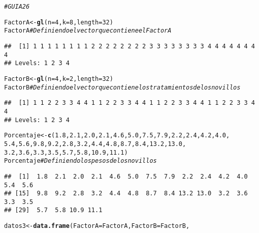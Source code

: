 \documentclass{article}\usepackage[]{graphicx}\usepackage[]{color}
\makeatletter
\newcommand{\hlnum}[1]{\textcolor[rgb]{0.686,0.059,0.569}{#1}}%
\newcommand{\hlcom}[1]{\textcolor[rgb]{0.678,0.584,0.686}{\textit{#1}}}%
\newcommand{\hlstd}[1]{\textcolor[rgb]{0.345,0.345,0.345}{#1}}%
\newcommand{\hlkwb}[1]{\textcolor[rgb]{0.69,0.353,0.396}{#1}}%
\newcommand{\hlkwc}[1]{\textcolor[rgb]{0.333,0.667,0.333}{#1}}%
\newcommand{\hlkwd}[1]{\textcolor[rgb]{0.737,0.353,0.396}{\textbf{#1}}}%
\newenvironment{kframe}{%
 \def\at@end@of@kframe{}%
 \ifinner\ifhmode%
  \def\at@end@of@kframe{\end{minipage}}%
  \begin{minipage}{\columnwidth}%
 \fi\fi%
 \def\FrameCommand##1{\hskip\@totalleftmargin \hskip-\fboxsep
 \colorbox{shadecolor}{##1}\hskip-\fboxsep
     \hskip-\linewidth \hskip-\@totalleftmargin \hskip\columnwidth}%
 \MakeFramed {\advance\hsize-\width
   \@totalleftmargin\z@ \linewidth\hsize
   \@setminipage}}%
 {\par\unskip\endMakeFramed%
 \at@end@of@kframe}
\newenvironment{knitrout}{}{} %
\makeatother
\begin{document}
\begin{knitrout}
\color{fgcolor}\begin{kframe}
\begin{alltt}
\hlcom{#GUIA 26}

\hlstd{FactorA}\hlkwb{<-}\hlkwd{gl}\hlstd{(}\hlkwc{n}\hlstd{=}\hlnum{4}\hlstd{,}\hlkwc{k}\hlstd{=}\hlnum{8}\hlstd{,}\hlkwc{length} \hlstd{=} \hlnum{32}\hlstd{)}
\hlstd{FactorA} \hlcom{# Definiendo el vector que contiene el Factor A}
\end{alltt}
\begin{verbatim}
##  [1] 1 1 1 1 1 1 1 1 2 2 2 2 2 2 2 2 3 3 3 3 3 3 3 3 4 4 4 4 4 4 4 4
## Levels: 1 2 3 4
\end{verbatim}
\begin{alltt}
\hlstd{FactorB}\hlkwb{<-}\hlkwd{gl}\hlstd{(}\hlkwc{n}\hlstd{=}\hlnum{4}\hlstd{,}\hlkwc{k}\hlstd{=}\hlnum{2}\hlstd{,}\hlkwc{length} \hlstd{=} \hlnum{32}\hlstd{)}
\hlstd{FactorB} \hlcom{# Definiendo el vector que contiene los tratamientos de los novillos}
\end{alltt}
\begin{verbatim}
##  [1] 1 1 2 2 3 3 4 4 1 1 2 2 3 3 4 4 1 1 2 2 3 3 4 4 1 1 2 2 3 3 4 4
## Levels: 1 2 3 4
\end{verbatim}
\begin{alltt}
\hlstd{Porcentaje}\hlkwb{<-}\hlkwd{c}\hlstd{(}\hlnum{1.8}\hlstd{,}\hlnum{2.1}\hlstd{,}\hlnum{2.0}\hlstd{,}\hlnum{2.1}\hlstd{,}\hlnum{4.6}\hlstd{,}\hlnum{5.0}\hlstd{,}\hlnum{7.5}\hlstd{,}\hlnum{7.9}\hlstd{,}\hlnum{2.2}\hlstd{,}\hlnum{2.4}\hlstd{,}\hlnum{4.2}\hlstd{,}\hlnum{4.0}\hlstd{,}
              \hlnum{5.4}\hlstd{,}\hlnum{5.6}\hlstd{,}\hlnum{9.8}\hlstd{,}\hlnum{9.2}\hlstd{,}\hlnum{2.8}\hlstd{,}\hlnum{3.2}\hlstd{,}\hlnum{4.4}\hlstd{,}\hlnum{4.8}\hlstd{,}\hlnum{8.7}\hlstd{,}\hlnum{8.4}\hlstd{,}\hlnum{13.2}\hlstd{,}\hlnum{13.0}\hlstd{,}
              \hlnum{3.2}\hlstd{,}\hlnum{3.6}\hlstd{,}\hlnum{3.3}\hlstd{,}\hlnum{3.5}\hlstd{,}\hlnum{5.7}\hlstd{,}\hlnum{5.8}\hlstd{,}\hlnum{10.9}\hlstd{,}\hlnum{11.1}\hlstd{)}
\hlstd{Porcentaje} \hlcom{# Definiendo los pesos de los novillos}
\end{alltt}
\begin{verbatim}
##  [1]  1.8  2.1  2.0  2.1  4.6  5.0  7.5  7.9  2.2  2.4  4.2  4.0  5.4  5.6
## [15]  9.8  9.2  2.8  3.2  4.4  4.8  8.7  8.4 13.2 13.0  3.2  3.6  3.3  3.5
## [29]  5.7  5.8 10.9 11.1
\end{verbatim}
\begin{alltt}
\hlstd{datos3}\hlkwb{<-}\hlkwd{data.frame}\hlstd{(}\hlkwc{FactorA}\hlstd{=FactorA,}\hlkwc{FactorB}\hlstd{=FactorB,}

\end{alltt}
\end{kframe}
\end{knitrout}
\end{document}
